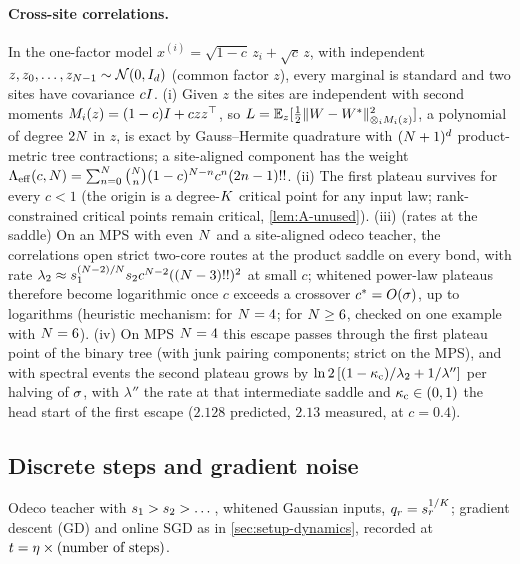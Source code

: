 \paragraph{Cross-site correlations.} In the one-factor model $x^{(i)}=\sqrt{1-c}\,z_i+\sqrt c\,z$, with
independent $z,z_0,\dots,z_{N-1}\sim\mathcal{N}(0,I_d)$ (common factor $z$), every marginal is standard and two
sites have covariance $cI$. (i) \proven{}  Given $z$ the sites are independent with second moments $M_i(z)=(1-c)I+czz^{\top}$, so
$L=\mathbb{E}_{z}[\frac12\lVert W-W^{*}\rVert^2_{\otimes_iM_i(z)}]$, a polynomial of degree $2N$ in $z$, is exact by
Gauss--Hermite quadrature with $(N+1)^d$ product-metric tree contractions; a site-aligned component has
the weight $\Lambda_{\rm eff}(c,N)=\sum_{n=0}^{N}\binom{N}{n}(1-c)^{N-n}c^n(2n-1)!!$. (ii) \derived{} The first plateau survives
for every $c<1$ (the origin is a degree-$K$ critical point for any input law; rank-constrained critical
points remain critical, \cref{lem:A-unused}). (iii) \proven{} (rates at the saddle) \newresult{} On an MPS
with even $N$ and a site-aligned odeco teacher, the correlations open strict two-core routes at the
product saddle on every bond, with rate $\lambda_2\approx s_{1}^{(N-2)/N}s_{2}c^{N-2}((N-3)!!)^2$ at small $c$; whitened
power-law plateaus therefore become logarithmic once $c$ exceeds a crossover $c^*=O(\sigma)$, up to logarithms
(heuristic mechanism: \empirical{} for $N=4$; \conjecture{} for $N\ge6$, checked on one example with
$N=6$). (iv) \derived{} On
MPS $N=4$ this escape passes through the first plateau point of the binary tree (with junk pairing
components; strict on the MPS), and with spectral events the second plateau grows by
$\ln2\,[(1-\kappa_{\rm c})/\lambda_2+1/\lambda'']$ per halving of $\sigma$, with $\lambda''$ the rate at that intermediate saddle and
$\kappa_{\rm c}\in(0,1)$ the head start of the first escape ($2.128$ predicted, $2.13$ measured, at $c=0.4$).

\subsection{Discrete steps and gradient noise}\label{app:optimizer}

Odeco teacher with $s_{1}>s_{2}>\dots$, whitened Gaussian inputs, $q_r=s_{r}^{1/K}$; gradient descent (GD) and
online SGD as in \cref{sec:setup-dynamics}, recorded at $t=\eta\times(\text{number of steps})$.

